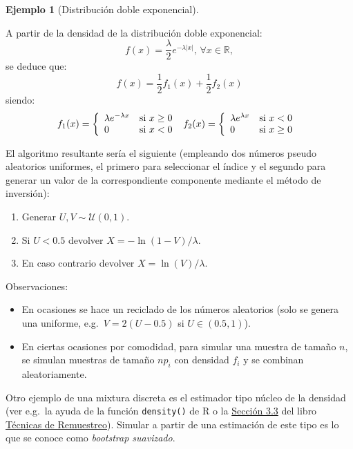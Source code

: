 \documentclass[
]{book}
\theoremstyle{break}
\theoremstyle{definition}
\theoremstyle{definition}
\newtheorem{example}{Ejemplo}[chapter]
\theoremstyle{definition}
\theoremstyle{definition}
\theoremstyle{remark}
\begin{document}
\begin{example}[Distribución doble exponencial]
\protect\hypertarget{exm:dexp-mix}{}{\label{exm:dexp-mix} {} }
\end{example}
A partir de la densidad de la distribución doble exponencial:
\[f(x) =\frac{\lambda }{2}e^{-\lambda \left\vert x\right\vert }%
\text{, }\forall x\in \mathbb{R},\]
se deduce que:
\[f(x) =\frac{1}{2}f_{1}(x) +\frac{1}{2}f_{2}\left(
x\right)\]
siendo:
\[f_{1}(x) = \left\{ 
\begin{array}{ll}
\lambda e^{-\lambda x} & \text{si } x\geq 0 \\ 
0 & \text{si } x<0
\end{array}
\ \right. \\
f_{2}(x) = \left\{ 
\begin{array}{ll}
\lambda e^{\lambda x} & \text{si } x<0 \\ 
0 & \text{si } x\geq 0
\end{array}
\ \right.\]

El algoritmo resultante sería el siguiente (empleando dos números pseudo aleatorios uniformes, el primero para seleccionar el índice y el segundo para generar un valor de la correspondiente componente mediante el método de inversión):

\begin{enumerate}
\def\labelenumi{\arabic{enumi}.}
\item
  Generar \(U,V\sim \mathcal{U}(0, 1)\).
\item
  Si \(U<0.5\) devolver \(X=-\ln \left( 1-V\right)/\lambda\).
\item
  En caso contrario devolver \(X=\ln(V)/\lambda\).
\end{enumerate}

Observaciones:

\begin{itemize}
\item
  En ocasiones se hace un reciclado de los números aleatorios
  (solo se genera una uniforme, e.g.~\(V=2(U-0.5)\) si
  \(U\in (0.5,1)\)).
\item
  En ciertas ocasiones por comodidad, para simular una muestra de
  tamaño \(n\), se simulan muestras de tamaño \(np_{i}\) con densidad
  \(f_{i}\) y se combinan aleatoriamente.
\end{itemize}

Otro ejemplo de una mixtura discreta es el estimador tipo núcleo de la densidad (ver e.g.~la ayuda de la función \texttt{density()} de R o la \href{https://rubenfcasal.github.io/book_remuestreo/modunif-boot-suav.html}{Sección 3.3} del libro \href{https://rubenfcasal.github.io/book_remuestreo}{Técnicas de Remuestreo}).
Simular a partir de una estimación de este tipo es lo que se conoce como \emph{bootstrap suavizado}.
\end{document}
